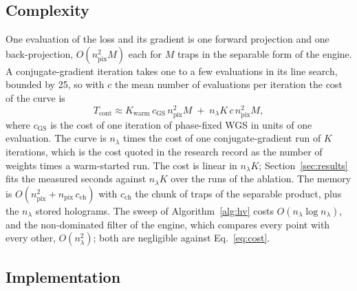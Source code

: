 \subsection{Complexity}\label{sec:complexity}

One evaluation of the loss and its gradient is one forward projection and one back-projection, $O(n_{\mathrm{pix}}^2M)$ each for $M$ traps in the separable form of the engine. A conjugate-gradient iteration takes one to a few evaluations in its line search, bounded by 25, so with $c$ the mean number of evaluations per iteration the cost of the curve is
\begin{equation}
T_{\mathrm{cont}}\approx K_{\mathrm{warm}}\,c_{\mathrm{GS}}\,n_{\mathrm{pix}}^2M\;+\;n_\lambda K\,c\,n_{\mathrm{pix}}^2M,\label{eq:cost}
\end{equation}
where $c_{\mathrm{GS}}$ is the cost of one iteration of phase-fixed WGS in units of one evaluation. The curve is $n_\lambda$ times the cost of one conjugate-gradient run of $K$ iterations, which is the cost quoted in the research record as the number of weights times a warm-started run.
The cost is linear in $n_\lambda K$; Section~\ref{sec:results} fits the measured seconds against $n_\lambda K$ over the runs of the ablation. The memory is $O(n_{\mathrm{pix}}^2+n_{\mathrm{pix}}\,c_{\mathrm{ch}})$ with $c_{\mathrm{ch}}$ the chunk of traps of the separable product, plus the $n_\lambda$ stored holograms. The sweep of Algorithm~\ref{alg:hv} costs
$O(n_\lambda\log n_\lambda)$, and the non-dominated filter of the engine, which compares every point with every other, $O(n_\lambda^2)$; both are negligible against Eq.~\ref{eq:cost}.

\subsection{Implementation}\label{sec:implementation}

